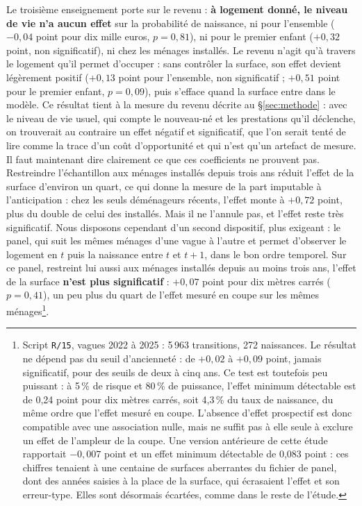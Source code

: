 \documentclass[12pt,a4paper]{article}
\begin{document}
\noindent Le troisième enseignement porte sur le revenu : \textbf{à logement donné, le niveau de vie n'a aucun effet} sur la probabilité de naissance, ni pour l'ensemble ($-0{,}04$ point pour dix mille euros, $p = 0{,}81$), ni pour le premier enfant ($+0{,}32$ point, non significatif), ni chez les ménages installés. Le revenu n'agit qu'à travers le logement qu'il permet d'occuper : sans contrôler la surface, son effet devient légèrement positif ($+0{,}13$ point pour l'ensemble, non significatif ; $+0{,}51$ point pour le premier enfant, $p = 0{,}09$), puis s'efface quand la surface entre dans le modèle. Ce résultat tient à la mesure du revenu décrite au §\ref{sec:methode} : avec le niveau de vie usuel, qui compte le nouveau-né et les prestations qu'il déclenche, on trouverait au contraire un effet négatif et significatif, que l'on serait tenté de lire comme la trace d'un coût d'opportunité et qui n'est qu'un artefact de mesure. \\

\noindent Il faut maintenant dire clairement ce que ces coefficients ne prouvent pas. Restreindre l'échantillon aux ménages installés depuis trois ans réduit l'effet de la surface d'environ un quart, ce qui donne la mesure de la part imputable à l'anticipation : chez les seuls déménageurs récents, l'effet monte à $+0{,}72$ point, plus du double de celui des installés. Mais il ne l'annule pas, et l'effet reste très significatif. Nous disposons cependant d'un second dispositif, plus exigeant : le panel, qui suit les mêmes ménages d'une vague à l'autre et permet d'observer le logement en $t$ puis la naissance entre $t$ et $t+1$, dans le bon ordre temporel. Sur ce panel, restreint lui aussi aux ménages installés depuis au moins trois ans, l'effet de la surface \textbf{n'est plus significatif} : $+0{,}07$ point pour dix mètres carrés ($p = 0{,}41$), un peu plus du quart de l'effet mesuré en coupe sur les mêmes ménages\footnote{Script \texttt{R/15}, vagues 2022 à 2025 : 5\,963 transitions, 272 naissances. Le résultat ne dépend pas du seuil d'ancienneté : de $+0{,}02$ à $+0{,}09$ point, jamais significatif, pour des seuils de deux à cinq ans. Ce test est toutefois peu puissant : à 5\,\% de risque et 80\,\% de puissance, l'effet minimum détectable est de 0,24 point pour dix mètres carrés, soit 4,3\,\% du taux de naissance, du même ordre que l'effet mesuré en coupe. L'absence d'effet prospectif est donc compatible avec une association nulle, mais ne suffit pas à elle seule à exclure un effet de l'ampleur de la coupe. Une version antérieure de cette étude rapportait $-0{,}007$ point et un effet minimum détectable de 0,083 point : ces chiffres tenaient à une centaine de surfaces aberrantes du fichier de panel, dont des années saisies à la place de la surface, qui écrasaient l'effet et son erreur-type. Elles sont désormais écartées, comme dans le reste de l'étude.}. \\
\end{document}
